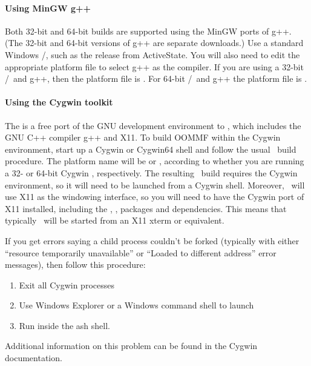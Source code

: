 \paragraph{Using MinGW g++}

Both 32-bit and 64-bit builds are supported using the MinGW ports of
g++.  (The 32-bit and 64-bit versions of g++ are separate downloads.)
Use a standard Windows \Tcl/\Tk, such as the
release from ActiveState.  You will also need to edit the appropriate
platform file to select g++ as the compiler.  If you are using a 32-bit
\Tcl/\Tk\ and g++, then the platform file is
.  For 64-bit
\Tcl/\Tk\ and g++ the platform file is
.

\paragraph{Using the Cygwin toolkit}\label{par:install.cygwin}
The  is
a free port of the GNU development environment to \Windows, which
includes the GNU C++ compiler g++ and X11.  To build OOMMF within the
Cygwin environment, start up a Cygwin or Cygwin64 shell and follow the
usual \Unix\ build procedure.  The platform name will be 
or , according to whether you are running a 32- or
64-bit Cygwin , respectively.  The resulting \OOMMF\ build
requires the Cygwin environment, so it will need to be launched from
a Cygwin shell.  Moreover, \OOMMF\ will use X11 as the windowing
interface, so you will need to have the Cygwin port of X11 installed,
including the , ,
 packages and dependencies.  This means that
typically \OOMMF\ will be started from an X11 xterm or equivalent.

If you get errors saying a child process couldn't be forked (typically
with either ``resource temporarily unavailable'' or ``Loaded to
different address'' error messages), then follow this procedure:
\begin{enumerate}
\item Exit all Cygwin processes
\item Use Windows Explorer or a Windows command shell to launch
\item Run  inside the ash shell.
\end{enumerate}
Additional information on this problem can be found in the Cygwin
documentation.

